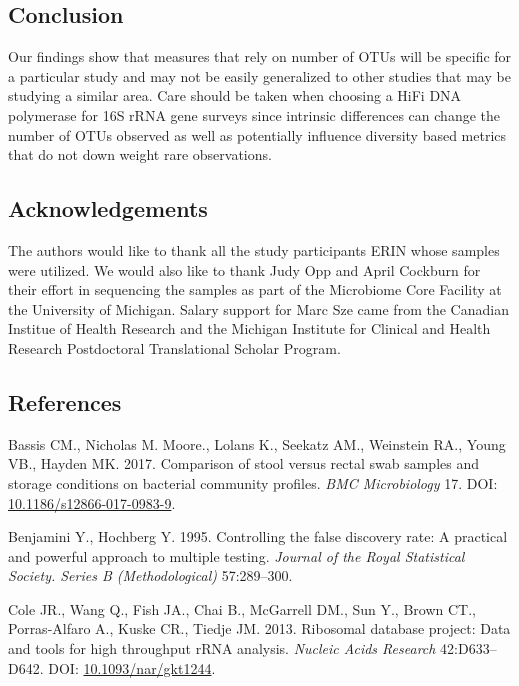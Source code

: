 \documentclass[12pt,]{article}
\begin{document}
\newpage

\subsection{Conclusion}\label{conclusion}

Our findings show that measures that rely on number of OTUs will be
specific for a particular study and may not be easily generalized to
other studies that may be studying a similar area. Care should be taken
when choosing a HiFi DNA polymerase for 16S rRNA gene surveys since
intrinsic differences can change the number of OTUs observed as well as
potentially influence diversity based metrics that do not down weight
rare observations.

\newpage

\subsection{Acknowledgements}\label{acknowledgements}

The authors would like to thank all the study participants ERIN whose
samples were utilized. We would also like to thank Judy Opp and April
Cockburn for their effort in sequencing the samples as part of the
Microbiome Core Facility at the University of Michigan. Salary support
for Marc Sze came from the Canadian Institue of Health Research and the
Michigan Institute for Clinical and Health Research Postdoctoral
Translational Scholar Program.

\newpage

\subsection{References}\label{references}

\hypertarget{refs}{}
\hypertarget{ref-storage_Bassis_2017}{}
Bassis CM., Nicholas M. Moore., Lolans K., Seekatz AM., Weinstein RA.,
Young VB., Hayden MK. 2017. Comparison of stool versus rectal swab
samples and storage conditions on bacterial community profiles.
\emph{BMC Microbiology} 17. DOI:
\href{https://doi.org/10.1186/s12866-017-0983-9}{10.1186/s12866-017-0983-9}.

\hypertarget{ref-benjamini_controlling_1995}{}
Benjamini Y., Hochberg Y. 1995. Controlling the false discovery rate: A
practical and powerful approach to multiple testing. \emph{Journal of
the Royal Statistical Society. Series B (Methodological)} 57:289--300.

\hypertarget{ref-rdp_Cole_2013}{}
Cole JR., Wang Q., Fish JA., Chai B., McGarrell DM., Sun Y., Brown CT.,
Porras-Alfaro A., Kuske CR., Tiedje JM. 2013. Ribosomal database
project: Data and tools for high throughput rRNA analysis. \emph{Nucleic
Acids Research} 42:D633--D642. DOI:
\href{https://doi.org/10.1093/nar/gkt1244}{10.1093/nar/gkt1244}.
\end{document}
